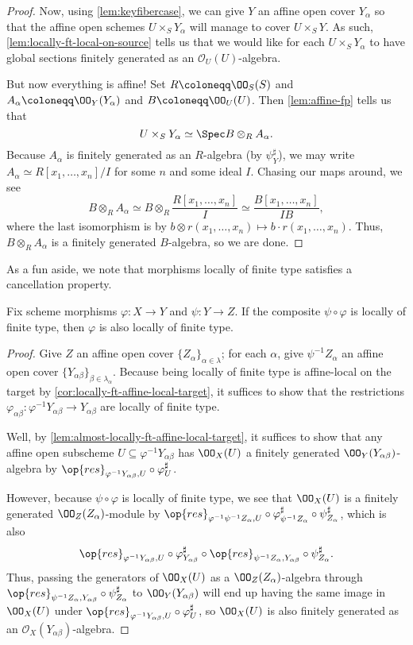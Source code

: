 \documentclass[../notes.tex]{subfiles}
\begin{document}
\begin{proof}
	Now, using \autoref{lem:keyfibercase}, we can give $Y$ an affine open cover $Y_\alpha$ so that the affine open schemes $U\times_SY_\alpha$ will manage to cover $U\times_SY$. As such, \autoref{lem:locally-ft-local-on-source} tells us that we would like for each $U\times_SY_\alpha$ to have global sections finitely generated as an $\mathcal O_U(U)$-algebra.

	But now everything is affine! Set $R\coloneqq\OO_S(S)$ and $A_\alpha\coloneqq\OO_Y(Y_\alpha)$ and $B\coloneqq\OO_U(U)$. Then \autoref{lem:affine-fp} tells us that
	\[U\times_SY_\alpha\simeq\Spec B\otimes_RA_\alpha.\]
	Because $A_\alpha$ is finitely generated as an $R$-algebra (by $\psi_Y^\sharp$), we may write $A_\alpha\simeq R[x_1,\ldots,x_n]/I$ for some $n$ and some ideal $I$. Chasing our maps around, we see
	\[B\otimes_RA_\alpha\simeq B\otimes_R\frac{R[x_1,\ldots,x_n]}I\simeq\frac{B[x_1,\ldots,x_n]}{IB},\]
	where the last isomorphism is by $b\otimes r(x_1,\ldots,x_n)\mapsto b\cdot r(x_1,\ldots,x_n)$. Thus, $B\otimes_RA_\alpha$ is a finitely generated $B$-algebra, so we are done.
\end{proof}
As a fun aside, we note that morphisms locally of finite type satisfies a cancellation property.
\begin{lemma} \label{lem:cancel-locally-ft}
	Fix scheme morphisms $\varphi\colon X\to Y$ and $\psi\colon Y\to Z$. If the composite $\psi\circ\varphi$ is locally of finite type, then $\varphi$ is also locally of finite type.
\end{lemma}
\begin{proof}
	Give $Z$ an affine open cover $\{Z_\alpha\}_{\alpha\in\lambda}$; for each $\alpha$, give $\psi^{-1}Z_\alpha$ an affine open cover $\{Y_{\alpha\beta}\}_{\beta\in\lambda_\alpha}$. Because being locally of finite type is affine-local on the target by \autoref{cor:locally-ft-affine-local-target}, it suffices to show that the restrictions $\varphi_{\alpha\beta}\colon\varphi^{-1}Y_{\alpha\beta}\to Y_{\alpha\beta}$ are locally of finite type.

	Well, by \autoref{lem:almost-locally-ft-affine-local-target}, it suffices to show that any affine open subscheme $U\subseteq\varphi^{-1}Y_{\alpha\beta}$ has $\OO_X(U)$ a finitely generated $\OO_Y(Y_{\alpha\beta})$-algebra by ${\op{res}_{\varphi^{-1}Y_{\alpha\beta},U}}\circ\varphi^\sharp_U$.
	
	However, because $\psi\circ\varphi$ is locally of finite type, we see that $\OO_X(U)$ is a finitely generated $\OO_Z(Z_\alpha)$-module by ${\op{res}_{\varphi^{-1}\psi^{-1}Z_\alpha,U}}\circ\varphi^\sharp_{\psi^{-1}Z_\alpha}\circ\psi^\sharp_{Z_\alpha}$, which is also
	\[{\op{res}_{\varphi^{-1}Y_{\alpha\beta},U}}\circ\varphi^\sharp_{Y_{\alpha\beta}}\circ{\op{res}_{\psi^{-1}Z_\alpha,Y_{\alpha\beta}}}\circ\psi^\sharp_{Z_\alpha}.\]
	Thus, passing the generators of $\OO_X(U)$ as a $\OO_Z(Z_\alpha)$-algebra through $\op{res}_{\psi^{-1}Z_\alpha,Y_{\alpha\beta}}\circ\psi^\sharp_{Z_\alpha}$ to $\OO_Y(Y_{\alpha\beta})$ will end up having the same image in $\OO_X(U)$ under ${\op{res}_{\varphi^{-1}Y_{\alpha\beta},U}}\circ\varphi^\sharp_U$, so $\OO_X(U)$ is also finitely generated as an $\mathcal O_X(Y_{\alpha\beta})$-algebra.
\end{proof}
\end{document}
